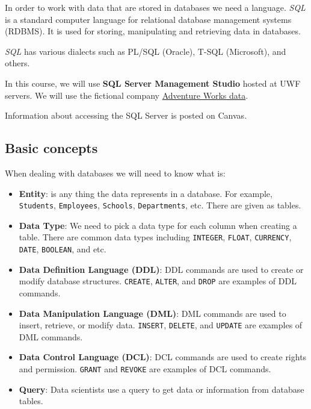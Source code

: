 \documentclass[
  letterpaper,
  DIV=11,
  numbers=noendperiod]{scrreprt}
\begin{document}
In order to work with data that are stored in databases we need a
language. \emph{SQL} is a standard computer language for relational
database management systems (RDBMS). It is used for storing,
manipulating and retrieving data in databases.

\emph{SQL} has various dialects such as PL/SQL (Oracle), T-SQL
(Microsoft), and others.

In this course, we will use \textbf{SQL Server Management Studio} hosted
at UWF servers. We will use the fictional company
\href{https://docs.microsoft.com/en-us/previous-versions/sql/sql-server-2008/ms124623(v=sql.100)}{Adventure
Works data}.

Information about accessing the SQL Server is posted on Canvas.

\hypertarget{basic-concepts}{%
\subsection*{Basic concepts}\label{basic-concepts}}

When dealing with databases we will need to know what is:

\begin{itemize}
\item
  \textbf{Entity}: is any thing the data represents in a database. For
  example, \texttt{Students}, \texttt{Employees}, \texttt{Schools},
  \texttt{Departments}, etc. There are given as tables.
\item
  \textbf{Data Type}: We need to pick a data type for each column when
  creating a table. There are common data types including
  \texttt{INTEGER}, \texttt{FLOAT}, \texttt{CURRENCY}, \texttt{DATE},
  \texttt{BOOLEAN}, and etc.
\item
  \textbf{Data Definition Language (DDL)}: DDL commands are used to
  create or modify database structures. \texttt{CREATE}, \texttt{ALTER},
  and \texttt{DROP} are examples of DDL commands.
\item
  \textbf{Data Manipulation Language (DML)}: DML commands are used to
  insert, retrieve, or modify data. \texttt{INSERT}, \texttt{DELETE},
  and \texttt{UPDATE} are examples of DML commands.
\item
  \textbf{Data Control Language (DCL)}: DCL commands are used to create
  rights and permission. \texttt{GRANT} and \texttt{REVOKE} are examples
  of DCL commands.
\item
  \textbf{Query}: Data scientists use a query to get data or information
  from database tables.
\end{itemize}
\end{document}
